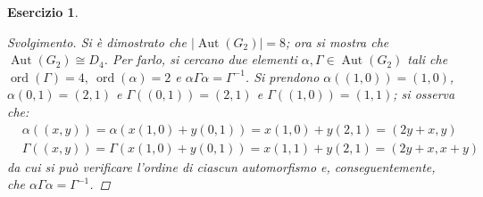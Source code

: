 \documentclass[11pt]{scrartcl}
\theoremstyle{style1}
\newtheorem{esercizio}{Esercizio}[section]
\newenvironment{svolgimento}{\renewcommand\qedsymbol{$\blacksquare$}\begin{proof}[Svolgimento]}{\end{proof}}
\numberwithin{equation}{subsection}
\begin{document}
\begin{esercizio}
\begin{svolgimento}
	Si \`e dimostrato che $|\operatorname{Aut} (G_2)| = 8$; ora si mostra che $\operatorname{Aut} (G_2) \cong D_4$.
	Per farlo, si cercano due elementi $\alpha , \Gamma \in \operatorname{Aut} (G_2)$ tali che $\operatorname{ord}(\Gamma) = 4, \ \operatorname{ord}(\alpha ) = 2$ e $\alpha \Gamma \alpha = \Gamma^{-1}$.
	Si prendono $\alpha ((1,0))= (1,0)$, $\alpha (0,1) = (2,1)$ e $\Gamma((0,1)) = (2,1)$ e $\Gamma((1,0)) = (1,1)$; si osserva che:
	\[
	\begin{split}
		&\alpha ((x,y)) = \alpha (x(1,0)+y(0,1)) = x(1,0) + y (2,1) =(2y+x,y)\\
		& \Gamma((x,y)) = \Gamma (x(1,0) + y (0,1)) = x (1,1) + y(2,1) = (2y+x,x+y)
	\end{split}
	\] 
	da cui si pu\`o verificare l'ordine di ciascun automorfismo e, conseguentemente, che $\alpha \Gamma\alpha = \Gamma^{-1}$.
\end{svolgimento}
\end{esercizio}
\end{document}
